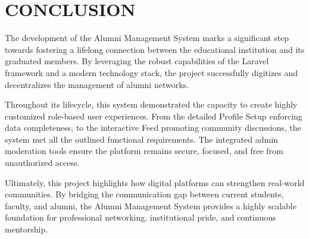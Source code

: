 \chapter{CONCLUSION}

The development of the Alumni Management System marks a significant step towards fostering a lifelong connection between the educational institution and its graduated members. By leveraging the robust capabilities of the Laravel framework and a modern technology stack, the project successfully digitizes and decentralizes the management of alumni networks.

Throughout its lifecycle, this system demonstrated the capacity to create highly customized role-based user experiences. From the detailed Profile Setup enforcing data completeness, to the interactive Feed promoting community discussions, the system met all the outlined functional requirements. The integrated admin moderation tools ensure the platform remains secure, focused, and free from unauthorized access.

Ultimately, this project highlights how digital platforms can strengthen real-world communities. By bridging the communication gap between current students, faculty, and alumni, the Alumni Management System provides a highly scalable foundation for professional networking, institutional pride, and continuous mentorship.
